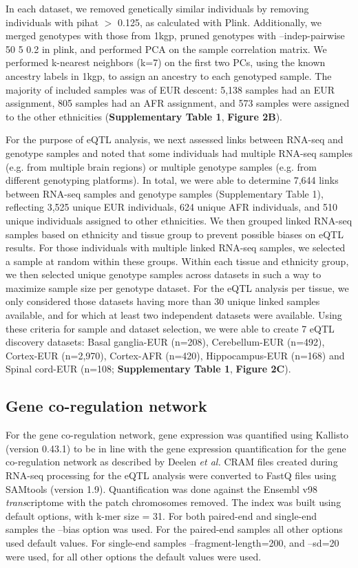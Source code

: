 {In each dataset, we removed genetically similar individuals by removing individuals with pihat $>$ 0.125, as calculated with Plink. Additionally, we merged genotypes with those from 1kgp, pruned genotypes with --indep-pairwise 50 5 0.2 in plink, and performed PCA on the sample correlation matrix. We performed k-nearest neighbors (k=7) on the first two PCs, using the known ancestry labels in 1kgp, to assign an ancestry to each genotyped sample. The majority of included samples was of EUR descent: 5,138 samples had an EUR assignment, 805 samples had an AFR assignment, and 573 samples were assigned to the other ethnicities (\textbf{Supplementary Table 1}, \textbf{Figure 2B}). 

For the purpose of eQTL analysis, we next assessed links between RNA-seq and genotype samples and noted that some individuals had multiple RNA-seq samples (e.g. from multiple brain regions) or multiple genotype samples (e.g. from different genotyping platforms). In total, we were able to determine 7,644 links between RNA-seq samples and genotype samples (Supplementary Table 1), reflecting 3,525 unique EUR individuals, 624 unique AFR individuals, and 510 unique individuals assigned to other ethnicities. We then grouped linked RNA-seq samples based on ethnicity and tissue group to prevent possible biases on eQTL results. For those individuals with multiple linked RNA-seq samples, we selected a sample at random within these groups. Within each tissue and ethnicity group, we then selected unique genotype samples across datasets in such a way to maximize sample size per genotype dataset. For the eQTL analysis per tissue, we only considered those datasets having more than 30 unique linked samples available, and for which at least two independent datasets were available. Using these criteria for sample and dataset selection, we were able to create 7 eQTL discovery datasets: Basal ganglia-EUR (n=208), Cerebellum-EUR (n=492), Cortex-EUR (n=2,970), Cortex-AFR (n=420), Hippocampus-EUR (n=168) and Spinal cord-EUR (n=108; \textbf{Supplementary Table 1}, \textbf{Figure 2C}). 

\subsection{Gene co-regulation network}
For the gene co-regulation network, gene expression was quantified using Kallisto\cite{brayNearoptimalProbabilisticRNAseq2016} (version 0.43.1) to be in line with the gene expression quantification for the gene co-regulation network as described by Deelen \emph{et al.}\cite{deelenImprovingDiagnosticYield2019}  CRAM files created during RNA-seq processing for the eQTL analysis were converted to FastQ files using SAMtools\cite{liSequenceAlignmentMap2009} (version 1.9). Quantification was done against the Ensembl\cite{cunninghamEnsembl20192019} v98 \emph{trans}criptome with the patch chromosomes removed. The index was built using default options, with k-mer size = 31. For both paired-end and single-end samples the –bias option was used. For the paired-end samples all other options used default values. For single-end samples –fragment-length=200, and –sd=20 were used, for all other options the default values were used. 

}
